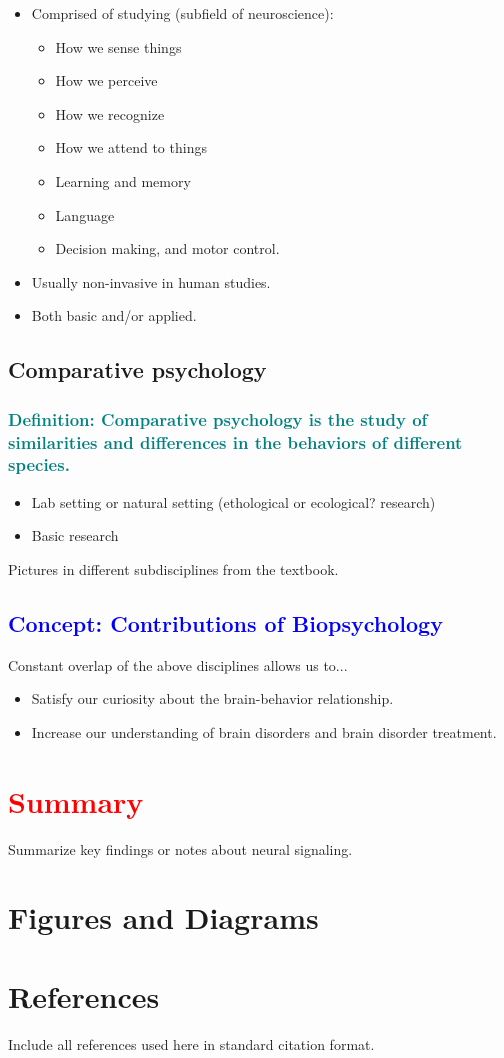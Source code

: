 \documentclass[12pt,a4paper]{article}
\newcommand{\concept}[1]{\subsection*{\textcolor{blue}{Concept: #1}}}
\newcommand{\definition}[1]{\subsubsection*{\textcolor{teal}{Definition: #1}}}
\newcommand{\summary}{\section*{\textcolor{red}{Summary}}}
\begin{document}
	\begin{itemize}
		\item Comprised of studying (subfield of neuroscience):
		\begin{itemize}
			\item How we sense things
			\item How we perceive
			\item How we recognize
			\item How we attend to things
			\item Learning and memory
			\item Language
			\item Decision making, and motor control. 
		\end{itemize}
		\item Usually non-invasive in human studies. 
		\item Both basic and/or applied. 
	\end{itemize}
	
	\subsection{Comparative psychology}
	
	\definition{\textbf{Comparative psychology} is the study of similarities and differences in the behaviors of different species.}
	
	\begin{itemize}
		\item Lab setting or natural setting (ethological or ecological? research)
		\item Basic research
	\end{itemize}
	
	Pictures in different subdisciplines from the textbook. 
	
	\concept{Contributions of Biopsychology}
	
	Constant overlap of the above disciplines allows us to...
	
	\begin{itemize}
		\item Satisfy our curiosity about the brain-behavior relationship.
		\item Increase our understanding of brain disorders and brain disorder treatment. 
	\end{itemize}
	
	\summary
	Summarize key findings or notes about neural signaling.
	
	\section{Figures and Diagrams}

	
	
	\section{References}
	Include all references used here in standard citation format.
	
\end{document}
